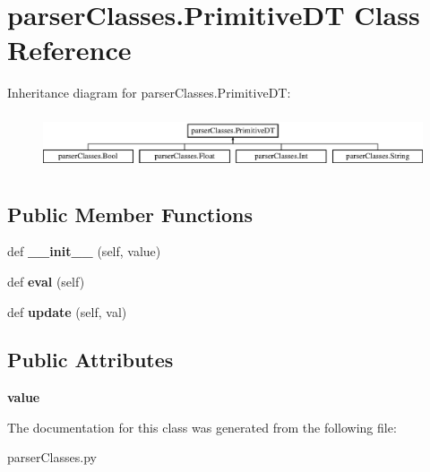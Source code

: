 \hypertarget{classparser_classes_1_1_primitive_d_t}{}\section{parser\+Classes.\+Primitive\+DT Class Reference}
\label{classparser_classes_1_1_primitive_d_t}
Inheritance diagram for parser\+Classes.\+Primitive\+DT\+:\begin{figure}[H]
\begin{center}
\leavevmode
\includegraphics[height=1.656805cm]{classparser_classes_1_1_primitive_d_t}
\end{center}
\end{figure}
\subsection*{Public Member Functions}
\begin{DoxyCompactItemize}
\item 
def {\bfseries \+\_\+\+\_\+init\+\_\+\+\_\+} (self, value)\hypertarget{classparser_classes_1_1_primitive_d_t_afc7a88a3500def7e2831c94385b822e3}{}\label{classparser_classes_1_1_primitive_d_t_afc7a88a3500def7e2831c94385b822e3}

\item 
def {\bfseries eval} (self)\hypertarget{classparser_classes_1_1_primitive_d_t_a4b0a4891bc06d83090e2dde406114214}{}\label{classparser_classes_1_1_primitive_d_t_a4b0a4891bc06d83090e2dde406114214}

\item 
def {\bfseries update} (self, val)\hypertarget{classparser_classes_1_1_primitive_d_t_ad52adc67041de2a7abfe4c25c0b0558d}{}\label{classparser_classes_1_1_primitive_d_t_ad52adc67041de2a7abfe4c25c0b0558d}

\end{DoxyCompactItemize}
\subsection*{Public Attributes}
\begin{DoxyCompactItemize}
\item 
{\bfseries value}\hypertarget{classparser_classes_1_1_primitive_d_t_a2f2bc9ba2df4e0db223f44eef3f2c162}{}\label{classparser_classes_1_1_primitive_d_t_a2f2bc9ba2df4e0db223f44eef3f2c162}

\end{DoxyCompactItemize}


The documentation for this class was generated from the following file\+:\begin{DoxyCompactItemize}
\item 
parser\+Classes.\+py\end{DoxyCompactItemize}
